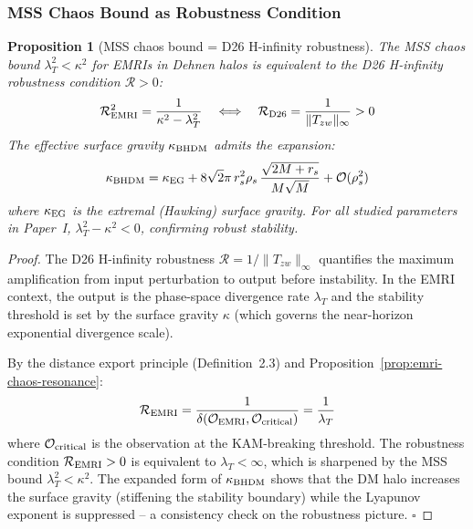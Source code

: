 \documentclass[
]{article}
\newtheorem{proposition}[theorem]{Proposition}
\begin{document}
\subsubsection{MSS Chaos Bound as Robustness Condition}\label{subsec:mss-robustness}

\begin{proposition}[MSS chaos bound = D26 H-infinity robustness]\label{prop:mss-robustness}
The MSS chaos bound $\lambda_T^2 < \kappa^2$ for EMRIs in Dehnen halos is equivalent to the D26 H-infinity robustness condition $\mathcal{R} > 0$:
\begin{equation}
\mathcal{R}_{\rm EMRI}^2 = \frac{1}{\kappa^2 - \lambda_T^2} \quad \Longleftrightarrow \quad \mathcal{R}_{\rm D26} = \frac{1}{\|T_{zw}\|_\infty} > 0
\end{equation}
The effective surface gravity $\kappa_{\rm BHDM}$ admits the expansion:
\begin{equation}
\kappa_{\rm BHDM} = \kappa_{\rm EG} + 8\sqrt{2}\pi\,r_s^2\rho_s\,\frac{\sqrt{2M+r_s}}{M\sqrt{M}} + \mathcal{O}(\rho_s^2)
\end{equation}
where $\kappa_{\rm EG}$ is the extremal (Hawking) surface gravity. For all studied parameters in Paper~I, $\lambda_T^2 - \kappa^2 < 0$, confirming robust stability.
\end{proposition}

\begin{proof}
The D26 H-infinity robustness $\mathcal{R} = 1/\|T_{zw}\|_\infty$ quantifies the maximum amplification from input perturbation to output before instability. In the EMRI context, the output is the phase-space divergence rate $\lambda_T$ and the stability threshold is set by the surface gravity $\kappa$ (which governs the near-horizon exponential divergence scale).

By the distance export principle (Definition~2.3) and Proposition~\ref{prop:emri-chaos-resonance}:
\begin{equation}
\mathcal{R}_{\rm EMRI} = \frac{1}{\delta(\mathcal{O}_{\rm EMRI}, \mathcal{O}_{\rm critical})} = \frac{1}{\lambda_T}
\end{equation}
where $\mathcal{O}_{\rm critical}$ is the observation at the KAM-breaking threshold. The robustness condition $\mathcal{R}_{\rm EMRI} > 0$ is equivalent to $\lambda_T < \infty$, which is sharpened by the MSS bound $\lambda_T^2 < \kappa^2$. The expanded form of $\kappa_{\rm BHDM}$ shows that the DM halo increases the surface gravity (stiffening the stability boundary) while the Lyapunov exponent is suppressed -- a consistency check on the robustness picture. $\square$
\end{proof}
\end{document}
